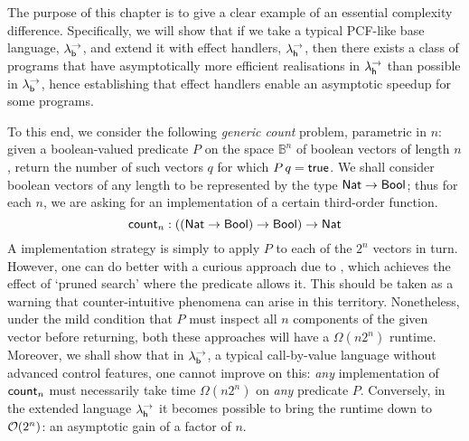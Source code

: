 \documentclass[12pt,phd,lfcs,twoside,openright,logo,leftchapter,normalheadings]{infthesis}
\theoremstyle{plain}
\theoremstyle{definition}
\begin{document}
The purpose of this chapter is to give a clear example of an essential
complexity difference. Specifically, we will show that if we take a
typical PCF-like base language, $\lambda^\rightarrow_{\mathsf{b}}$, and extend it with effect
handlers, $\lambda^\rightarrow_{\mathsf{h}}$, then there exists a class of programs that have
asymptotically more efficient realisations in $\lambda^\rightarrow_{\mathsf{h}}$ than possible in
$\lambda^\rightarrow_{\mathsf{b}}$, hence establishing that effect handlers enable an asymptotic
speedup for some programs.
%

To this end, we consider the following \emph{generic count} problem,
parametric in $n$: given a boolean-valued predicate $P$ on the space
$\mathbb{B}^n$ of boolean vectors of length $n$, return the number of
such vectors $q$ for which $P\,q = \mathsf{true}$.  We shall consider boolean
vectors of any length to be represented by the type $\mathsf{Nat} \to \mathsf{Bool}$;
thus for each $n$, we are asking for an implementation of a certain
third-order function.
%
\[ \mathsf{count}_n : ((\mathsf{Nat} \to \mathsf{Bool}) \to \mathsf{Bool}) \to \mathsf{Nat}  \]
%
A \naive implementation strategy is simply to apply $P$ to each of the
$2^n$ vectors in turn.  However, one can do better with a curious
approach due to \citet{Berger90}, which achieves the effect of `pruned
search' where the predicate allows it. This should be taken as a
warning that counter-intuitive phenomena can arise in this territory.
Nonetheless, under the mild condition that $P$ must inspect all $n$
components of the given vector before returning, both these approaches
will have a $\Omega(n 2^n)$ runtime.  Moreover, we shall show that in
$\lambda^\rightarrow_{\mathsf{b}}$, a typical call-by-value language without advanced control
features, one cannot improve on this: \emph{any} implementation of
$\mathsf{count}_n$ must necessarily take time $\Omega(n2^n)$ on \emph{any}
predicate $P$.  Conversely, in the extended language $\lambda^\rightarrow_{\mathsf{h}}$ it
becomes possible to bring the runtime down to $\mathcal{O}(2^n)$: an
asymptotic gain of a factor of $n$.

\end{document}
